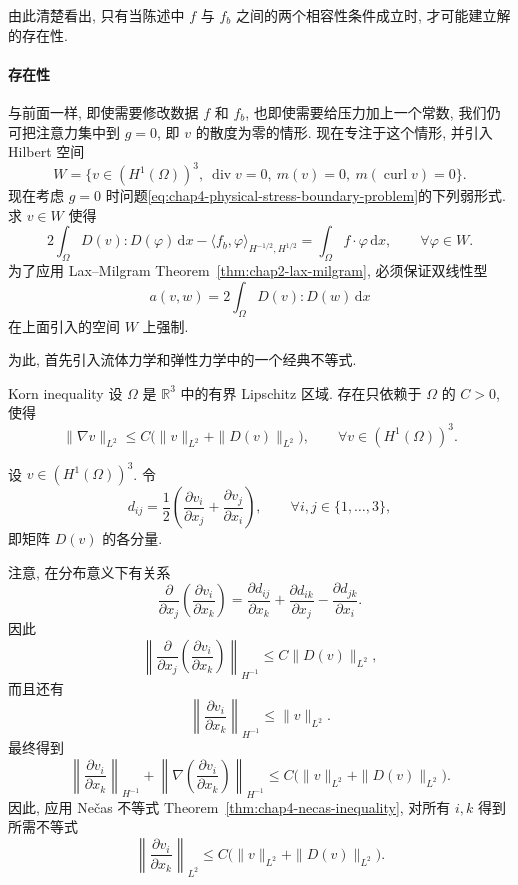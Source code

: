 由此清楚看出, 只有当陈述中 $f$ 与 $f_b$ 之间的两个相容性条件成立时, 才可能建立解的存在性.

\paragraph{存在性}
\label{subsubsec:chap4-stress-existence}

与前面一样, 即使需要修改数据 $f$ 和 $f_b$, 也即使需要给压力加上一个常数, 我们仍可把注意力集中到 $g=0$, 即 $v$ 的散度为零的情形. 现在专注于这个情形, 并引入 Hilbert 空间
\begin{equation}
 W=\{v\in(H^1(\Omega))^3,\ \operatorname{div}v=0,\ m(v)=0,\ m(\operatorname{curl}v)=0\}.
 \label{eq:chap4-stress-normalized-space}
\end{equation}
现在考虑 $g=0$ 时问题\eqref{eq:chap4-physical-stress-boundary-problem}的下列弱形式. 求 $v\in W$ 使得
\begin{equation}
 2\int_\Omega D(v):D(\varphi)\,\mathrm dx
 -\langle f_b,\varphi\rangle_{H^{-1/2},H^{1/2}}
 =\int_\Omega f\cdot\varphi\,\mathrm dx,
 \qquad\forall\varphi\in W.
 \label{eq:chap4-stress-weak-formulation}
\end{equation}
为了应用 Lax--Milgram Theorem~\ref{thm:chap2-lax-milgram}, 必须保证双线性型
\[
 a(v,w)=2\int_\Omega D(v):D(w)\,\mathrm dx
\]
在上面引入的空间 $W$ 上强制.

为此, 首先引入流体力学和弹性力学中的一个经典不等式.

\begin{Lemma}{Korn inequality}
\label{lem:chap4-korn-inequality}
设 $\Omega$ 是 $\mathbb R^3$ 中的有界 Lipschitz 区域. 存在只依赖于 $\Omega$ 的 $C>0$, 使得
\[
 \|\nabla v\|_{L^2}\leq C\bigl(\|v\|_{L^2}+\|D(v)\|_{L^2}\bigr),
 \qquad\forall v\in(H^1(\Omega))^3.
\]
\end{Lemma}

\begin{Proof}
设 $v\in(H^1(\Omega))^3$. 令
\[
 d_{ij}=\frac12\left(\frac{\partial v_i}{\partial x_j}
 +\frac{\partial v_j}{\partial x_i}\right),
 \qquad\forall i,j\in\{1,\ldots,3\},
\]
即矩阵 $D(v)$ 的各分量.

注意, 在分布意义下有关系
\[
 \frac{\partial}{\partial x_j}\left(\frac{\partial v_i}{\partial x_k}\right)
 =\frac{\partial d_{ij}}{\partial x_k}
 +\frac{\partial d_{ik}}{\partial x_j}
 -\frac{\partial d_{jk}}{\partial x_i}.
\]
因此
\[
 \left\|\frac{\partial}{\partial x_j}\left(\frac{\partial v_i}{\partial x_k}\right)\right\|_{H^{-1}}
 \leq C\|D(v)\|_{L^2},
\]
而且还有
\[
 \left\|\frac{\partial v_i}{\partial x_k}\right\|_{H^{-1}}
 \leq\|v\|_{L^2}.
\]
最终得到
\[
 \left\|\frac{\partial v_i}{\partial x_k}\right\|_{H^{-1}}
 +\left\|\nabla\left(\frac{\partial v_i}{\partial x_k}\right)\right\|_{H^{-1}}
 \leq C\bigl(\|v\|_{L^2}+\|D(v)\|_{L^2}\bigr).
\]
因此, 应用 Nečas 不等式 Theorem~\ref{thm:chap4-necas-inequality}, 对所有 $i,k$ 得到所需不等式
\[
 \left\|\frac{\partial v_i}{\partial x_k}\right\|_{L^2}
 \leq C\bigl(\|v\|_{L^2}+\|D(v)\|_{L^2}\bigr).
\]
\end{Proof}

